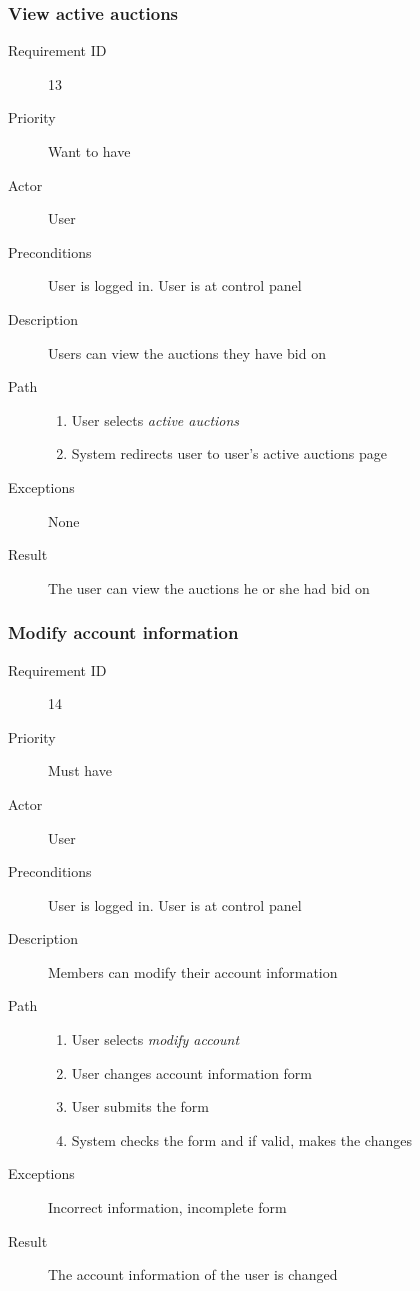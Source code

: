 		\subsubsection{View active auctions}
			\begin{description}
				\item[Requirement ID] 13
				\item[Priority] Want to have
				\item[Actor] User
				\item[Preconditions] User is logged in. User is at control panel
				\item[Description] Users can view the auctions they have bid on
				\item[Path]
 					\begin{enumerate}
						\item User selects \emph{active auctions}
						\item System redirects user to user's active auctions page
					\end{enumerate}
				\item[Exceptions] None
				\item[Result] The user can view the auctions he or she had bid on
			\end{description}
		\subsubsection{Modify account information}
			\begin{description}
				\item[Requirement ID] 14
				\item[Priority] Must have
				\item[Actor] User
				\item[Preconditions] User is logged in. User is at control panel
				\item[Description] Members can modify their account information
				\item[Path]
 					\begin{enumerate}
						\item User selects \emph{modify account}
						\item User changes account information form
						\item User submits the form
						\item System checks the form and if valid, makes the changes
					\end{enumerate}
				\item[Exceptions] Incorrect information, incomplete form
				\item[Result] The account information of the user is changed
			\end{description}
